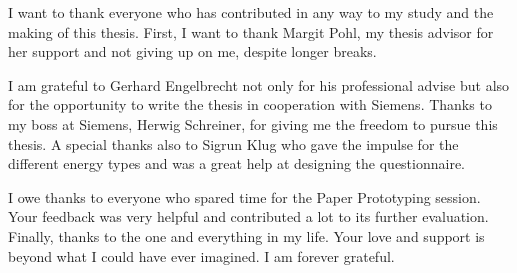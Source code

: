 \documentclass[draft,final]{vutinfth} %
\begin{document}
\frontmatter %

\addstatementpage

%
%
%

\begin{acknowledgements*}
I want to thank everyone who has contributed in any way to my study and the making of this thesis. First, I want to thank Margit Pohl, my thesis advisor for her support and not giving up on me, despite longer breaks.

I am grateful to Gerhard Engelbrecht not only for his professional advise but also for the opportunity to write the thesis in cooperation with Siemens. Thanks to my boss at Siemens, Herwig Schreiner, for giving me the freedom to pursue this thesis. A special thanks also to Sigrun Klug who gave the impulse for the different energy types and was a great help at designing the questionnaire.

I owe thanks to everyone who spared time for the Paper Prototyping session. Your feedback was very helpful and contributed a lot to its further evaluation. Finally, thanks to the one and everything in my life. Your love and support is beyond what I could have ever imagined. I am forever grateful.


\end{acknowledgements*}

\begin{kurzfassung}
\end{kurzfassung}
\end{document}
